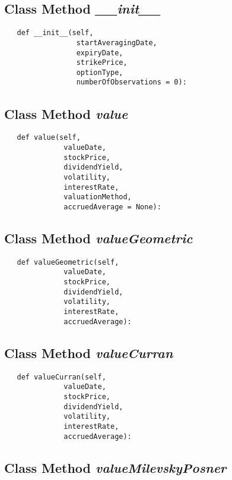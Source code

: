 \documentclass[twoside,11pt]{book}
\begin{document}
\subsection{Class Method {\it \_\_init\_\_}}


\begin{lstlisting}
   def __init__(self,
                 startAveragingDate,
                 expiryDate,
                 strikePrice,
                 optionType,
                 numberOfObservations = 0):
\end{lstlisting}

\subsection{Class Method {\it value}}


\begin{lstlisting}
   def value(self,
              valueDate,
              stockPrice,
              dividendYield,
              volatility,
              interestRate,
              valuationMethod,
              accruedAverage = None):
\end{lstlisting}

\subsection{Class Method {\it valueGeometric}}


\begin{lstlisting}
   def valueGeometric(self,
              valueDate,
              stockPrice,
              dividendYield,
              volatility,
              interestRate,
              accruedAverage):
\end{lstlisting}

\subsection{Class Method {\it valueCurran}}


\begin{lstlisting}
   def valueCurran(self,
              valueDate,
              stockPrice,
              dividendYield,
              volatility,
              interestRate,
              accruedAverage):
\end{lstlisting}

\subsection{Class Method {\it valueMilevskyPosner}}
\end{document}
